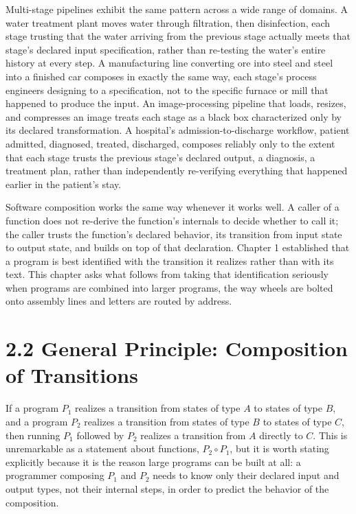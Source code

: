 \documentclass[11pt]{book}
\begin{document}
Multi-stage pipelines exhibit the same pattern across a wide range of domains. A water treatment plant moves water through filtration, then disinfection, each stage trusting that the water arriving from the previous stage actually meets that stage's declared input specification, rather than re-testing the water's entire history at every step. A manufacturing line converting ore into steel and steel into a finished car composes in exactly the same way, each stage's process engineers designing to a specification, not to the specific furnace or mill that happened to produce the input. An image-processing pipeline that loads, resizes, and compresses an image treats each stage as a black box characterized only by its declared transformation. A hospital's admission-to-discharge workflow, patient admitted, diagnosed, treated, discharged, composes reliably only to the extent that each stage trusts the previous stage's declared output, a diagnosis, a treatment plan, rather than independently re-verifying everything that happened earlier in the patient's stay.

Software composition works the same way whenever it works well. A caller of a function does not re-derive the function's internals to decide whether to call it; the caller trusts the function's declared behavior, its transition from input state to output state, and builds on top of that declaration. Chapter 1 established that a program is best identified with the transition it realizes rather than with its text. This chapter asks what follows from taking that identification seriously when programs are combined into larger programs, the way wheels are bolted onto assembly lines and letters are routed by address.

\section*{2.2 General Principle: Composition of Transitions}

If a program $P_1$ realizes a transition from states of type $A$ to states of type $B$, and a program $P_2$ realizes a transition from states of type $B$ to states of type $C$, then running $P_1$ followed by $P_2$ realizes a transition from $A$ directly to $C$. This is unremarkable as a statement about functions, $P_2 \circ P_1$, but it is worth stating explicitly because it is the reason large programs can be built at all: a programmer composing $P_1$ and $P_2$ needs to know only their declared input and output types, not their internal steps, in order to predict the behavior of the composition.
\end{document}
